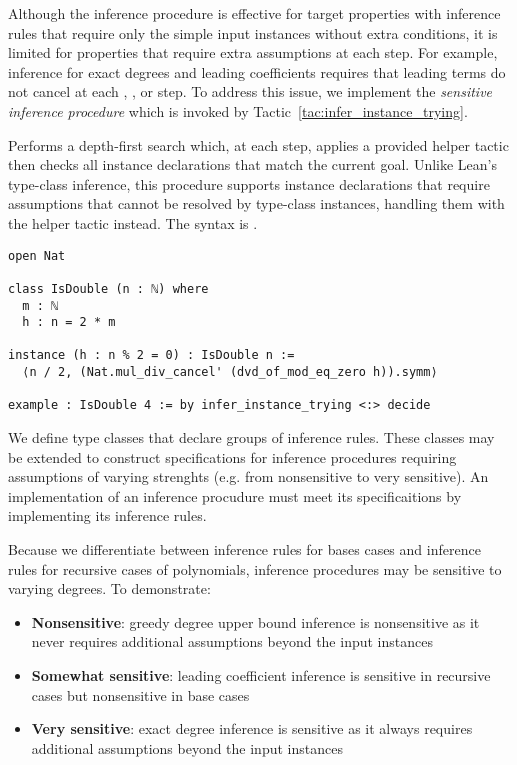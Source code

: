Although the inference procedure is effective for target properties with inference rules that require only the simple input instances without extra conditions, it is limited for properties that require extra assumptions at each step. For example, inference for exact degrees and leading coefficients requires that leading terms do not cancel at each \leaninline{+}, \leaninline{*}, or \leaninline{\^{}} step. To address this issue, we implement the \emph{sensitive inference procedure} which is invoked by Tactic~\ref{tac:infer_instance_trying}.

\begin{tactic}
\label{tac:infer_instance_trying}
\leanok
Performs a depth-first search which, at each step, applies a provided helper tactic  then checks all instance declarations that match the current goal. Unlike Lean's type-class inference, this procedure supports instance declarations that require assumptions that cannot be resolved by type-class instances, handling them with the helper tactic instead. The syntax is \leaninline{ <:> }.
\begin{lstlisting}
open Nat

class IsDouble (n : ℕ) where
  m : ℕ
  h : n = 2 * m

instance (h : n % 2 = 0) : IsDouble n :=
  ⟨n / 2, (Nat.mul_div_cancel' (dvd_of_mod_eq_zero h)).symm⟩

example : IsDouble 4 := by infer_instance_trying <:> decide
\end{lstlisting}
\end{tactic}

\label{sec:univariate}


We define type classes that declare groups of inference rules. These classes may be extended to construct specifications for inference procedures requiring assumptions of varying strenghts (e.g. from nonsensitive to very sensitive). An implementation of an inference procudure must meet its specificaitions by implementing its inference rules.

Because we differentiate between inference rules for bases cases and inference rules for recursive cases of polynomials, inference procedures may be sensitive to varying degrees. To demonstrate:

\begin{itemize}
\item \textbf{Nonsensitive}: greedy degree upper bound inference is nonsensitive as it never requires additional assumptions beyond the input instances
\item \textbf{Somewhat sensitive}: leading coefficient inference is sensitive in recursive cases but nonsensitive in base cases
\item \textbf{Very sensitive}: exact degree inference is sensitive as it always requires additional assumptions beyond the input instances
\end{itemize}

